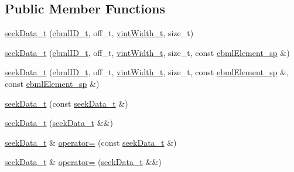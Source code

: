 \subsection*{Public Member Functions}
\begin{DoxyCompactItemize}
\item 
\mbox{\hyperlink{classebml_1_1seekData__t_a080c97211758dcec4045e5e08427cdb1}{seek\+Data\+\_\+t}} (\mbox{\hyperlink{namespaceebml_a86c5f604ddf12a74aa9812e997a58691}{ebml\+I\+D\+\_\+t}}, off\+\_\+t, \mbox{\hyperlink{namespaceebml_a2ccdfb60b23efb51fe07f9d066e23604}{vint\+Width\+\_\+t}}, size\+\_\+t)
\item 
\mbox{\hyperlink{classebml_1_1seekData__t_ad64e95299ca85c695b33eb8230cbe48c}{seek\+Data\+\_\+t}} (\mbox{\hyperlink{namespaceebml_a86c5f604ddf12a74aa9812e997a58691}{ebml\+I\+D\+\_\+t}}, off\+\_\+t, \mbox{\hyperlink{namespaceebml_a2ccdfb60b23efb51fe07f9d066e23604}{vint\+Width\+\_\+t}}, size\+\_\+t, const \mbox{\hyperlink{namespaceebml_adad533b7705a16bb360fe56380c5e7be}{ebml\+Element\+\_\+sp}} \&)
\item 
\mbox{\hyperlink{classebml_1_1seekData__t_a4073e066b0e82681eb486e249a5a3ed2}{seek\+Data\+\_\+t}} (\mbox{\hyperlink{namespaceebml_a86c5f604ddf12a74aa9812e997a58691}{ebml\+I\+D\+\_\+t}}, off\+\_\+t, \mbox{\hyperlink{namespaceebml_a2ccdfb60b23efb51fe07f9d066e23604}{vint\+Width\+\_\+t}}, size\+\_\+t, const \mbox{\hyperlink{namespaceebml_adad533b7705a16bb360fe56380c5e7be}{ebml\+Element\+\_\+sp}} \&, const \mbox{\hyperlink{namespaceebml_adad533b7705a16bb360fe56380c5e7be}{ebml\+Element\+\_\+sp}} \&)
\item 
\mbox{\hyperlink{classebml_1_1seekData__t_a8df38b86c02a5cc3491970ae48605a29}{seek\+Data\+\_\+t}} (const \mbox{\hyperlink{classebml_1_1seekData__t}{seek\+Data\+\_\+t}} \&)
\item 
\mbox{\hyperlink{classebml_1_1seekData__t_a19592a08f48414ada236b0264be6c3b6}{seek\+Data\+\_\+t}} (\mbox{\hyperlink{classebml_1_1seekData__t}{seek\+Data\+\_\+t}} \&\&)
\item 
\mbox{\hyperlink{classebml_1_1seekData__t}{seek\+Data\+\_\+t}} \& \mbox{\hyperlink{classebml_1_1seekData__t_a9ecc0247b6026b2cfd055b302a620166}{operator=}} (const \mbox{\hyperlink{classebml_1_1seekData__t}{seek\+Data\+\_\+t}} \&)
\item 
\mbox{\hyperlink{classebml_1_1seekData__t}{seek\+Data\+\_\+t}} \& \mbox{\hyperlink{classebml_1_1seekData__t_a7e1b55089fe090b9c2412f140411e2c3}{operator=}} (\mbox{\hyperlink{classebml_1_1seekData__t}{seek\+Data\+\_\+t}} \&\&)
\item 

\end{DoxyCompactItemize}
